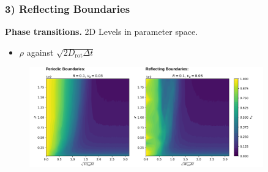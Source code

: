 \begin{frame}
	\frametitle{3) Reflecting Boundaries}
	\textbf{Phase transitions.} 2D Levels in parameter space.
	\begin{itemize}
	    \item $\rho$ against $\sqrt{2D_{\text{rot}}\Delta t}$
	\end{itemize}
	\begin{figure}[H]
  		\includegraphics[width=0.9\textwidth]{images/chapter3/rho_eta_transition_2D_comparison_pbc_rbc.png} 
	\end{figure}
\end{frame}

\begin{frame}
\end{frame}